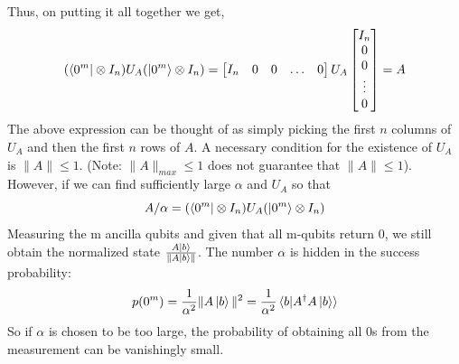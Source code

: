 \documentclass[12pt, oneside]{book}
\theoremstyle{definition}
\theoremstyle{definition}
\theoremstyle{remark}
\begin{document}
Thus, on putting it all together we get,
\[
(\bra{0^m}\otimes I_n)U_A(\ket{0^m}\otimes I_n)=\begin{bmatrix} I_n & 0 & 0 & \ldots & 0 \end{bmatrix}U_A\begin{bmatrix} I_n \\ 0 \\ 0 \\ \vdots \\ 0 \end{bmatrix}=A
\]
The above expression can be thought of as simply picking the first $n$ columns of $U_A$ and then the first $n$ rows of $A$. A necessary condition for the existence of $U_A$ is $\|A\| \leq 1$. (Note: $\|A\|_{max}\leq 1$ does not guarantee that $\|A\|\leq 1$). However, if we can find sufficiently large $\alpha$ and $U_A$ so that
\[
A/\alpha = (\bra{0^m}\otimes I_n)U_A(\ket{0^m}\otimes I_n)
\]
Measuring the m ancilla qubits and given that all m-qubits return 0, we still obtain the normalized state $\frac{A\ket{b}}{\|A\ket{b}\|}$.
The number $\alpha$ is hidden in the success probability:
\[
p(0^m)=\frac{1}{\alpha^2}\|A\ket{b}\|^2=\frac{1}{\alpha^2}\braket{b|A^{\dagger}A\ket{b}}
\]
So if $\alpha$ is chosen to be too large, the probability of obtaining all $0$s from the measurement can be vanishingly small.
\end{document}
